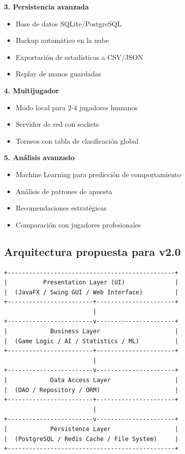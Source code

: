 \documentclass[12pt,a4paper]{article}
\begin{document}
\textbf{3. Persistencia avanzada}
\begin{itemize}
    \item Base de datos SQLite/PostgreSQL
    \item Backup automático en la nube
    \item Exportación de estadísticas a CSV/JSON
    \item Replay de manos guardadas
\end{itemize}

\textbf{4. Multijugador}
\begin{itemize}
    \item Modo local para 2-4 jugadores humanos
    \item Servidor de red con sockets
    \item Torneos con tabla de clasificación global
\end{itemize}

\textbf{5. Análisis avanzado}
\begin{itemize}
    \item Machine Learning para predicción de comportamiento
    \item Análisis de patrones de apuesta
    \item Recomendaciones estratégicas
    \item Comparación con jugadores profesionales
\end{itemize}

\subsection{Arquitectura propuesta para v2.0}

\begin{verbatim}
+-----------------------------------------------+
|          Presentation Layer (UI)              |
|  (JavaFX / Swing GUI / Web Interface)         |
+------------------------+----------------------+
                         |
+------------------------v----------------------+
|            Business Layer                     |
|  (Game Logic / AI / Statistics / ML)          |
+------------------------+----------------------+
                         |
+------------------------v----------------------+
|            Data Access Layer                  |
|  (DAO / Repository / ORM)                     |
+------------------------+----------------------+
                         |
+------------------------v----------------------+
|            Persistence Layer                  |
|  (PostgreSQL / Redis Cache / File System)     |
+-----------------------------------------------+
\end{verbatim}
\end{document}
